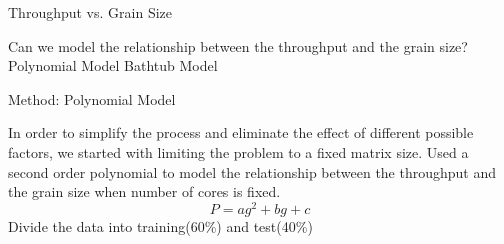 \documentclass[10pt]{beamer}
\begin{document}
\begin{frame}{Throughput vs. Grain Size}
	\begin{outline}
		Can we model the relationship between the throughput and the grain size?
		\pause
		\1Polynomial Model
		\1Bathtub Model
	\end{outline}
\end{frame}


\begin{frame}{Method: Polynomial Model}
	\begin{outline}
		In order to simplify the process and eliminate the effect of different possible factors, we started with limiting the problem to a fixed matrix size.	
		\1Used a second order polynomial to model the relationship between the throughput and the grain size when number of cores is fixed.
		 $$P=ag^2+bg+c$$    
		 \1Divide the data into training(60\%) and test(40\%)
	\end{outline}
\end{frame}
\end{document}
